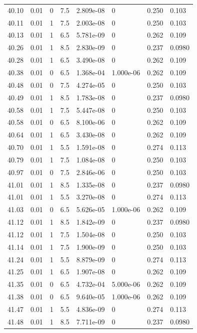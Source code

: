 \documentclass[preview]{standalone}
\begin{document}
{{{{{{{{{{{{{\begin{tabular}{L{1.2cm}C{1.2cm} C{0.3cm}C{0.5cm} C{1.4cm}C{1.4cm} C{1.4cm}C{1.4cm}}
  40.10  &  0.01  & 0     & 7.5 &  2.809e-08  & 0  & 0.250 &  0.103   \\ 
  40.11  &  0.01  & 1     & 7.5 &  2.003e-08  & 0  & 0.250 &  0.103   \\ 
  40.13  &  0.01  & 1     & 6.5 &  5.781e-09  & 0  & 0.262 &  0.109   \\ 
  40.26  &  0.01  & 1     & 8.5 &  2.830e-09  & 0  & 0.237 &  0.0980   \\ 
  40.28  &  0.01  & 1     & 6.5 &  3.490e-08  & 0  & 0.262 &  0.109   \\ 
  40.38  &  0.01  & 0     & 6.5 &  1.368e-04  & 1.000e-06  & 0.262 &  0.109   \\ 
  40.48  &  0.01  & 0     & 7.5 &  4.274e-05  & 0  & 0.250 &  0.103   \\ 
  40.49  &  0.01  & 1     & 8.5 &  1.783e-08  & 0  & 0.237 &  0.0980   \\ 
  40.58  &  0.01  & 1     & 7.5 &  5.447e-08  & 0  & 0.250 &  0.103   \\ 
  40.58  &  0.01  & 0     & 6.5 &  8.100e-06  & 0  & 0.262 &  0.109   \\ 
  40.64  &  0.01  & 1     & 6.5 &  3.430e-08  & 0  & 0.262 &  0.109   \\ 
  40.70  &  0.01  & 1     & 5.5 &  1.591e-08  & 0  & 0.274 &  0.113   \\ 
  40.79  &  0.01  & 1     & 7.5 &  1.084e-08  & 0  & 0.250 &  0.103   \\ 
  40.97  &  0.01  & 0     & 7.5 &  2.846e-06  & 0  & 0.250 &  0.103   \\ 
  41.01  &  0.01  & 1     & 8.5 &  1.335e-08  & 0  & 0.237 &  0.0980   \\ 
  41.01  &  0.01  & 1     & 5.5 &  3.270e-08  & 0  & 0.274 &  0.113   \\ 
  41.03  &  0.01  & 0     & 6.5 &  5.626e-05  & 1.000e-06  & 0.262 &  0.109   \\ 
  41.12  &  0.01  & 1     & 8.5 &  1.842e-09  & 0  & 0.237 &  0.0980   \\ 
  41.12  &  0.01  & 1     & 7.5 &  1.504e-08  & 0  & 0.250 &  0.103   \\ 
  41.14  &  0.01  & 1     & 7.5 &  1.900e-09  & 0  & 0.250 &  0.103   \\ 
  41.24  &  0.01  & 1     & 5.5 &  8.879e-09  & 0  & 0.274 &  0.113   \\ 
  41.25  &  0.01  & 1     & 6.5 &  1.907e-08  & 0  & 0.262 &  0.109   \\ 
  41.35  &  0.01  & 0     & 6.5 &  4.732e-04  & 5.000e-06  & 0.262 &  0.109   \\ 
  41.38  &  0.01  & 0     & 6.5 &  9.640e-05  & 1.000e-06  & 0.262 &  0.109   \\ 
  41.47  &  0.01  & 1     & 5.5 &  4.836e-09  & 0  & 0.274 &  0.113   \\ 
  41.48  &  0.01  & 1     & 8.5 &  7.711e-09  & 0  & 0.237 &  0.0980   \\ 
\hline 
\end{tabular} 

}}}}}}}}}}}}}
\end{document}
